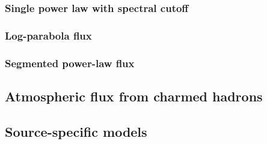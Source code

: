 \subsubsection{Single power law with spectral cutoff\label{sec:cutoff}}
\begingroup
\graphicspath{{results/HESE_Final_Paper/}}

\endgroup
\FloatBarrier

\subsubsection{Log-parabola flux\label{sec:log_parabola}}
\begingroup
\graphicspath{{results/HESE_Final_Paper/}}

\endgroup
\FloatBarrier

\subsubsection{Segmented power-law flux\label{sec:unfolding}}
\begingroup
\graphicspath{{results/HESE_Final_Paper/}}

\endgroup
\FloatBarrier

\subsection{Atmospheric flux from charmed hadrons\label{sec:prompt}}
\begingroup
\graphicspath{{results/HESE_Final_Paper/}}

\endgroup
\FloatBarrier

\subsection{Source-specific models\label{sec:specific_models}}
\begingroup
\graphicspath{{results/HESE_Final_Paper/}}

\endgroup
\FloatBarrier
